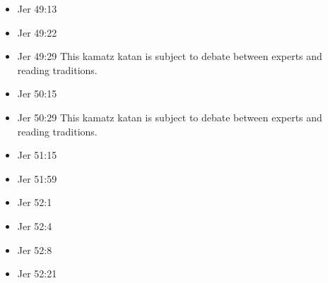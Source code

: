 \documentclass[14pt]{article}
\begin{document}
\begin{multicols}{2}
\begin{itemize}
								\item Jer 49:13
								
								\item Jer 49:22
								
								\item Jer 49:29 This kamatz katan is subject to debate between experts and reading traditions.
								
								\item Jer 50:15
								
								\item Jer 50:29 This kamatz katan is subject to debate between experts and reading traditions.
								
								\item Jer 51:15
								
								\item Jer 51:59
								
								\item Jer 52:1
								
								\item Jer 52:4
								
								\item Jer 52:8
								
								\item Jer 52:21
								
							\end{itemize}\end{multicols}
\end{document}

